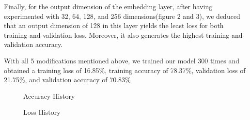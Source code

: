 \documentclass[12pt]{article}
\begin{document}
Finally, for the output dimension of the embedding layer, after having experimented with 32, 64, 128, and 256 dimensions(figure 2 and 3), we deduced that an output dimension of 128 in this layer yields the least loss for both training and validation loss. Moreover, it also generates the highest training and validation accuracy. 

With all 5 modifications mentioned above, we trained our model 300 times and obtained a training loss of 16.85\%, training accuracy of 78.37\%, validation loss of 21.75\%, and validation accuracy of 70.83\%

\newpage
\begin{figure}[H]
    \centering
    \caption{Accuracy History}
\end{figure}

\newpage
\begin{figure}[H]
    \centering
    \caption{Loss History}
\end{figure}

\newpage
\end{document}
